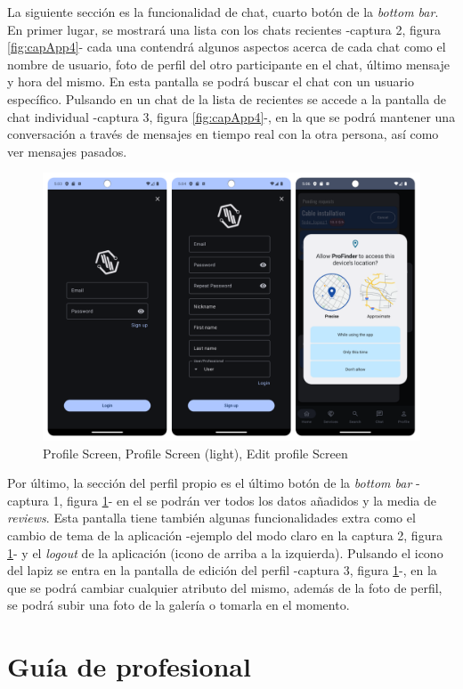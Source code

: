La siguiente sección es la funcionalidad de chat, cuarto botón de la \textit{bottom bar}. En primer lugar, se mostrará una lista con los chats recientes -captura 2, figura \ref{fig:capApp4}- cada una contendrá algunos aspectos acerca de cada chat como el nombre de usuario, foto de perfil del otro participante en el chat, último mensaje y hora del mismo. En esta pantalla se podrá buscar el chat con un usuario específico. Pulsando en un chat de la lista de recientes se accede a la pantalla de chat individual -captura 3, figura \ref{fig:capApp4}-, en la que se podrá mantener una conversación a través de mensajes en tiempo real con la otra persona, así como ver mensajes pasados.
\newpage
\begin{figure}[h]
	\centering
	\includegraphics[width = 1\textwidth]{Imagenes/capturasApp/login_signup_local.png}
	\caption{Profile Screen, Profile Screen (light), Edit profile Screen}
	\label{fig:capApp5}
\end{figure}

Por último, la sección del perfil propio es el último botón de la \textit{bottom bar} -captura 1, figura \ref{fig:capApp5}- en el se podrán ver todos los datos añadidos y la media de \textit{reviews}. Esta pantalla tiene también algunas funcionalidades extra como el cambio de tema de  la aplicación -ejemplo del modo claro en la captura 2, figura \ref{fig:capApp5}- y el \textit{logout} de la aplicación (icono de arriba a la izquierda). Pulsando el icono del lapiz se entra en la pantalla de edición del perfil -captura 3, figura \ref{fig:capApp5}-, en la que se podrá cambiar cualquier atributo del mismo, además de la foto de perfil, se podrá subir una foto de la galería o tomarla en el momento.

\section{Guía de profesional}
\label{sec:guiaProf}
